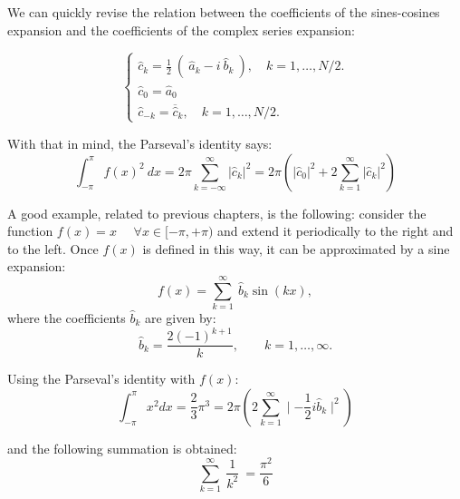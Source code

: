 We can quickly revise the relation between the coefficients of the sines-cosines expansion and the coefficients of the complex series expansion:  

$$
\begin{cases}
    \hat{c}_k  =  \frac{1}{2} \ ( \ \hat{a}_k  - i \ \hat{b}_k \ ),  \quad k=1, \ldots, N/2.   \\
    \hat{c}_0  = \hat{a}_0   \\
    \hat{c}_{-k}  =  \overline{ \hat{c} } _{k}  , \quad k=1, \ldots, N/2. 
\end{cases}
$$

With that in mind, the Parseval's identity says:
\begin{equation} 
	\int _{-\pi} ^{\pi} f(x)^2 \ dx =  2 \pi  \sum_{k=-\infty} ^{\infty}  | \hat{c}_k | ^2       =  2 \pi \left(    | \hat{c}_0 |^2 + 2 \sum_{k=1} ^{\infty} |  \hat{c}_k  |^2 \right) 
\end{equation} 





A good example, related to previous chapters, is the following: consider the function $ f(x) = x \quad $ $ \forall x \in [-\pi, +\pi ) $ and extend it periodically to the right and to the left. Once $ f(x) $ is defined in this way, it can be approximated by a sine expansion: 
\begin{equation} 
	f ( x )  =  \sum_{k=1} ^{\infty} \   \hat{b}_k  \sin \left(  kx\right), 
\end{equation} 
where the coefficients $ \hat{b}_k $ are given by:
\begin{equation} 
    \hat{b}_k   = \frac{ 2 (-1)^{k+1} }{ k }, \qquad k=1, \ldots,\infty. 
\end{equation} 

Using the Parseval's identity with $f(x)$:
$$
\int_{-\pi}^{\pi}  x^2 dx  = \frac{2}{3} \pi^3 = 2\pi \left(   2\sum_{k=1}^{\infty}  \mid  -\frac{1}{2} i \hat{b}_k   \mid ^2  \right)
$$

and the following summation is obtained: 
\begin{equation} 
    \sum_{k=1} ^{\infty} \  \frac{1}{k^2}  \  = \frac{\pi^2}{6}
\end{equation}


